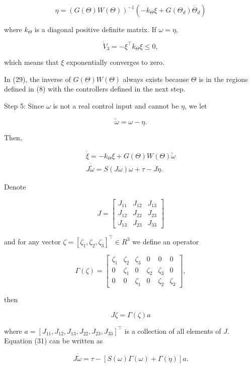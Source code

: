 \documentclass[10pt]{article}
\begin{document}
$$
\eta=(G(\Theta) W(\Theta))^{-1}\left(-k_{\Theta} \xi+G\left(\Theta_{d}\right) \dot{\Theta}_{d}\right)
$$

where $k_{\Theta}$ is a diagonal positive definite matrix. If $\omega=\eta$,

$$
\dot{V}_{3}=-\xi^{\top} k_{\Theta} \xi \leq 0,
$$

which means that $\xi$ exponentially converges to zero.

In (29), the inverse of $G(\Theta) W(\Theta)$ always exists because $\Theta$ is in the regions defined in (8) with the controllers defined in the next step.

Step 5: Since $\omega$ is not a real control input and cannot be $\eta$, we let

$$
\tilde{\omega}=\omega-\eta .
$$

Then,

$$
\begin{gathered}
\dot{\xi}=-k_{\Theta} \xi+G(\Theta) W(\Theta) \widetilde{\omega} \\
J \dot{\tilde{\omega}}=S(J \omega) \omega+\tau-J \dot{\eta} .
\end{gathered}
$$

Denote

$$
J=\left[\begin{array}{ccc}
J_{11} & J_{12} & J_{13} \\
J_{12} & J_{22} & J_{23} \\
J_{13} & J_{23} & J_{33}
\end{array}\right]
$$

and for any vector $\zeta=\left[\zeta_{1}, \zeta_{2}, \zeta_{3}\right]^{\top} \in R^{3}$ we define an operator

$$
\Gamma(\zeta)=\left[\begin{array}{cccccc}
\zeta_{1} & \zeta_{2} & \zeta_{3} & 0 & 0 & 0 \\
0 & \zeta_{1} & 0 & \zeta_{2} & \zeta_{3} & 0 \\
0 & 0 & \zeta_{1} & 0 & \zeta_{2} & \zeta_{3}
\end{array}\right],
$$

then

$$
J \zeta=\Gamma(\zeta) a
$$

where $a=\left[J_{11}, J_{12}, J_{13}, J_{22}, J_{23}, J_{33}\right]^{\top}$ is a collection of all elements of $J$. Equation (31) can be written as

$$
J \dot{\tilde{\omega}}=\tau-[S(\omega) \Gamma(\omega)+\Gamma(\dot{\eta})] a .
$$
\end{document}
